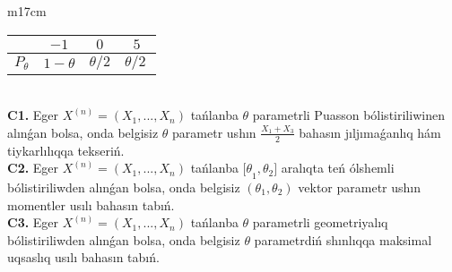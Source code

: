 \documentclass{article}
\begin{document}
\begin{tabular}{m{17cm}}
\begin{tabular}{|c|c|c|c|}
&
$- 1$
&
$0$
&
$5$\\
\hline
\(P_{\theta}\) & \(1 - \theta\) & \(\theta/2\) & \(\theta/2\ \) \\
\hline
\end{tabular}
 \\
\textbf{C1.} 
Eger \(X^{(n)} = \left( X_{1},...,X_{n} \right)\) tańlanba \(\theta\) parametrli Puasson bólistiriliwinen alınǵan bolsa, onda belgisiz \(\theta\) parametr ushın \(\frac{X_{1} + X_{3}}{2}\) bahasın jıljımaǵanlıq hám tiykarlılıqqa tekseriń.
 \\
\textbf{C2.} 
Eger \(X^{(n)} = \left( X_{1},...,X_{n} \right)\) tańlanba \({\lbrack\theta}_{1},\theta_{2}\rbrack\) aralıqta teń ólshemli bólistiriliwden alınǵan bolsa, onda belgisiz \(\left( \theta_{1},\theta_{2} \right)\) vektor parametr ushın momentler usılı bahasın tabıń.
 \\
\textbf{C3.} 
Eger \(X^{(n)} = \left( X_{1},...,X_{n} \right)\) tańlanba \(\theta\) parametrli geometriyalıq bólistiriliwden alınǵan bolsa, onda belgisiz \(\theta\) parametrdiń shınlıqqa maksimal uqsaslıq usılı bahasın tabıń.
 \\

\end{tabular}
\vspace{1cm}
\end{document}
